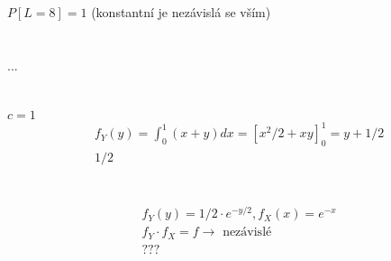 \documentclass[a4paper]{article}
\begin{document}
\section{}
$P[L=8] =1$ (konstantní je nezávislá se vším)

\section{}
...

\section{}
$c= 1$ \\
\begin{align*}
	& f_Y(y) = \int_0^1 (x+y) dx = [x^2/2 +xy]_0^1 = y+1/2 \\
	& 1/2
\end{align*}


\section{} 
\begin{align*}
	& f_Y(y) = 1/2 \cdot e^{-y/2}, f_X	(x) = e^{-x} \\
	& f_Y \cdot f_X = f \rightarrow \text{ nezávislé} \\
	& ???
\end{align*}
\end{document}

